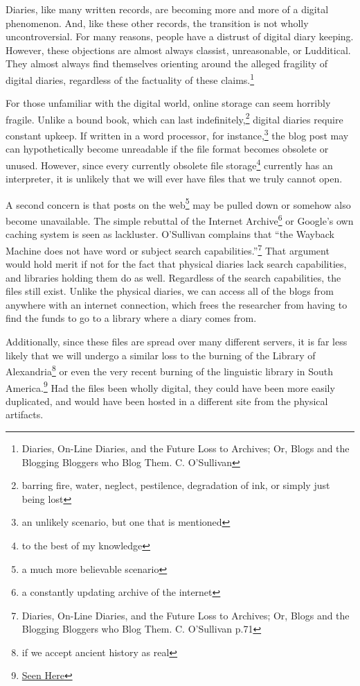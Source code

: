 \documentclass[12pt]{article}[titlepage]
\newcommand{\say}[1]{``#1''}
\newcommand{\1}{\={a}}
\newcommand{\2}{\={e}}
\newcommand{\3}{\={\i}}
\newcommand{\4}{\=o}
\newcommand{\5}{\=u}
\newcommand{\6}{\={A}}
\renewcommand{\,}{\textsuperscript{,}}
\begin{document}
Diaries, like many written records, are becoming more and more of a digital phenomenon.
And, like these other records, the transition is not wholly uncontroversial.
For many reasons, people have a distrust of digital diary keeping.
However, these objections are almost always classist, unreasonable, or Ludditical.
They almost always find themselves orienting around the alleged fragility of digital diaries, regardless of the factuality of these claims.\footnote{Diaries, On-Line Diaries, and the Future Loss to Archives; Or, Blogs and the Blogging Bloggers who Blog Them. C. O’Sullivan}

For those unfamiliar with the digital world, online storage can seem horribly fragile.
Unlike a bound book, which can last indefinitely,\footnote{barring fire, water, neglect, pestilence, degradation of ink, or simply just being lost} digital diaries require constant upkeep.
If written in a word processor, for instance,\footnote{an unlikely scenario, but one that is mentioned} the blog post may can hypothetically become unreadable if the file format becomes obsolete or unused.
However, since every currently obsolete file storage\footnote{to the best of my knowledge} currently has an interpreter, it is unlikely that we will ever have files that we truly cannot open.

A second concern is that posts on the web\footnote{a much more believable scenario} may be pulled down or somehow also become unavailable.
The simple rebuttal of the Internet Archive\footnote{a constantly updating archive of the internet} or Google’s own caching system is seen as lackluster.
O’Sullivan complains that \say{the Wayback Machine does not have word or subject search capabilities.}\footnote{Diaries, On-Line Diaries, and the Future Loss to Archives; Or, Blogs and the Blogging Bloggers who Blog Them. C. O’Sullivan p.71}
That argument would hold merit if not for the fact that physical diaries lack search capabilities, and libraries holding them do as well.
Regardless of the search capabilities, the files still exist.
Unlike the physical diaries, we can access all of the blogs from anywhere with an internet connection, which frees the researcher from having to find the funds to go to a library where a diary comes from.

Additionally, since these files are spread over many different servers, it is far less likely that we will undergo a similar loss to the burning of the Library of Alexandria\footnote{if we accept ancient history as real} or even the very recent burning of the linguistic library in South America.\footnote{\href{https://www.nationalgeographic.com/science/2018/09/news-museu-nacional-fire-rio-de-janeiro-natural-history/}{Seen Here}}
Had the files been wholly digital, they could have been more easily duplicated, and would have been hosted in a different site from the physical artifacts.
\end{document}
